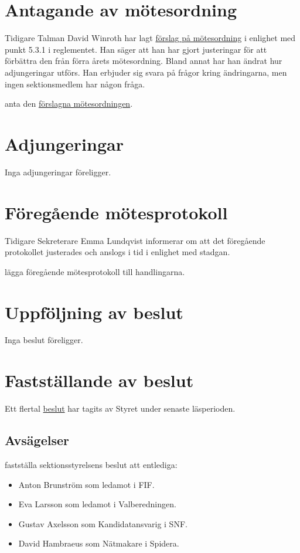 \documentclass[hidelinks]{../sektionsmote} %
\begin{document}
\section{Antagande av mötesordning}
Tidigare Talman David Winroth har lagt \hyperlink{bilagor/motesordning.pdf.1}{förslag på mötesordning} i enlighet med punkt 5.3.1 i reglementet.
Han säger att han har gjort justeringar för att förbättra den från förra årets mötesordning.
Bland annat har han ändrat hur adjungeringar utförs.
Han erbjuder sig svara på frågor kring ändringarna, men ingen sektionsmedlem har någon fråga.
\begin{beslut}
    \item anta den \hyperlink{bilagor/motesordning.pdf.1}{förslagna mötesordningen}.
\end{beslut}

\section{Adjungeringar}
Inga adjungeringar föreligger.


\section{Föregående mötesprotokoll}
Tidigare Sekreterare Emma Lundqvist informerar om att det föregående protokollet justerades och anslogs i tid i enlighet med stadgan.
\begin{beslut}
    \item lägga föregående mötesprotokoll till handlingarna. 
\end{beslut}


\section{Uppföljning av beslut}
Inga beslut föreligger.


\section{Fastställande av beslut}
Ett flertal \hyperlink{bilagor/beslut.pdf.1}{beslut} har tagits av Styret under senaste läsperioden.

\subsection{Avsägelser}
\begin{beslut}
    \item fastställa sektionsstyrelsens beslut att entlediga:
    \begin{itemize}
        \item Anton Brunström som ledamot i FIF.
        \item Eva Larsson som ledamot i Valberedningen.
        \item Gustav Axelsson som Kandidatansvarig i SNF.
        \item David Hambraeus som Nätmakare i Spidera.
    \end{itemize}
\end{beslut}
\end{document}
